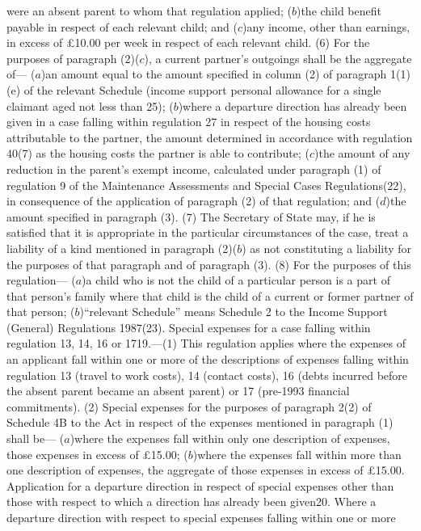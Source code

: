 \documentclass[a4paper]{article}
\begin{document}
were an absent parent to whom that regulation applied;
($b$)the child benefit payable in respect of each relevant child; and
($c$)any income, other than earnings, in excess of £10.00 per week in respect of
each relevant child.
(6) For the purposes of paragraph (2)($c$), a current partner’s outgoings shall be
the aggregate of—
($a$)an amount equal to the amount specified in column (2) of paragraph 1(1)(e) of
the relevant Schedule (income support personal allowance for a single claimant
aged not less than 25);
($b$)where a departure direction has already been given in a case falling within
regulation 27 in respect of the housing costs attributable to the partner, the
amount determined in accordance with regulation 40(7) as the housing costs the
partner is able to contribute;
($c$)the amount of any reduction in the parent’s exempt income, calculated under
paragraph (1) of regulation 9 of the Maintenance Assessments and Special Cases
Regulations(22), in consequence of the application of paragraph (2) of that
regulation; and
($d$)the amount specified in paragraph (3).
(7) The Secretary of State may, if he is satisfied that it is appropriate in the
particular circumstances of the case, treat a liability of a kind mentioned in
paragraph (2)($b$) as not constituting a liability for the purposes of that
paragraph and of paragraph (3).
(8) For the purposes of this regulation—
($a$)a child who is not the child of a particular person is a part of that
person’s family where that child is the child of a current or former partner of
that person;
($b$)“relevant Schedule” means Schedule 2 to the Income Support (General)
Regulations 1987(23).
Special expenses for a case falling within regulation 13, 14, 16 or 1719.—(1)
This regulation applies where the expenses of an applicant fall within one or
more of the descriptions of expenses falling within regulation 13 (travel to
work costs), 14 (contact costs), 16 (debts incurred before the absent parent
became an absent parent) or 17 (pre-1993 financial commitments).
(2) Special expenses for the purposes of paragraph 2(2) of Schedule 4B to the
Act in respect of the expenses mentioned in paragraph (1) shall be—
($a$)where the expenses fall within only one description of expenses, those
expenses in excess of £15.00;
($b$)where the expenses fall within more than one description of expenses, the
aggregate of those expenses in excess of £15.00.
Application for a departure direction in respect of special expenses other than
those with respect to which a direction has already been given20. Where a
departure direction with respect to special expenses falling within one or more
\end{document}
